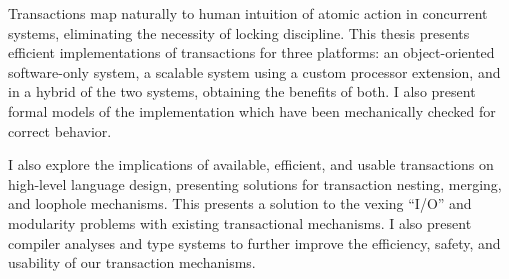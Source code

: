 
Transactions map naturally to human intuition of atomic action in
concurrent systems, eliminating the necessity of locking discipline.
This thesis presents efficient implementations of transactions for
three platforms: an object-oriented software-only system, a scalable
system using a custom processor extension, and in a hybrid of the two
systems, obtaining the benefits of both.  I also present formal models
of the implementation which have been mechanically checked for correct
behavior.

I also explore the implications of available, efficient, and usable
transactions on high-level language design, presenting solutions for
transaction nesting, merging, and loophole mechanisms.  This presents
a solution to the vexing ``I/O'' and modularity problems with
existing transactional mechanisms.  I also present compiler analyses
and type systems to further improve the efficiency, safety, and
usability of our transaction mechanisms.
